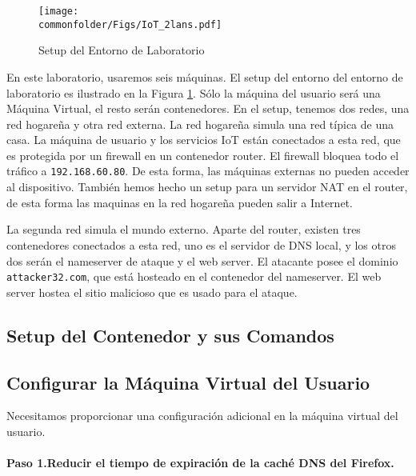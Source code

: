 \begin{figure}[htb]
\centering
\texttt{[image: \\commonfolder/Figs/IoT\_2lans.pdf]}
\caption{Setup del Entorno de Laboratorio}
\label{rebind:fig:labsetup}
\end{figure}

En este laboratorio, usaremos seis máquinas.
El setup del entorno del entorno de laboratorio es ilustrado en la Figura \ref{rebind:fig:labsetup}. Sólo la máquina del usuario será una Máquina Virtual, el resto serán contenedores.
En el setup, tenemos dos redes, una red hogareña y otra red externa. La red hogareña simula una red típica de una casa. La máquina de usuario y los servicios IoT están conectados a esta red, que es protegida por un firewall en un contenedor router. El firewall bloquea todo el tráfico  a \texttt{192.168.60.80}. De esta forma, las máquinas externas no pueden acceder al dispositivo.
También hemos hecho un setup para un servidor NAT en el router, de esta forma las maquinas en la red hogareña pueden salir a Internet.

La segunda red simula el mundo externo. Aparte del router, existen tres contenedores conectados a esta red, uno es el servidor de DNS local, y los otros dos serán el nameserver de ataque y el web server.
El atacante posee el dominio \texttt{attacker32.com}, que está hosteado en el contenedor del nameserver. El web server hostea el sitio malicioso que es usado para el ataque.


\subsection{Setup del Contenedor y sus Comandos}






\subsection{Configurar la Máquina Virtual del Usuario}

Necesitamos proporcionar una configuración adicional en la máquina virtual del usuario.


\paragraph{Paso 1.Reducir el tiempo de expiración de la caché DNS del Firefox.}

